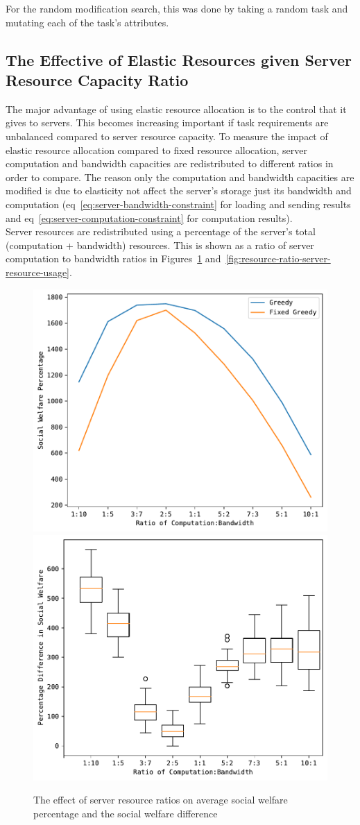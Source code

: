 For the random modification search, this was done by taking a random task and mutating each of the task's attributes.

\subsection{The Effective of Elastic Resources given Server Resource Capacity Ratio}
\label{subsec:the-effective-of-elastic-resources-given-server-resource-capacity-ratio}
The major advantage of using elastic resource allocation is to the control that it gives to servers. This becomes
increasing important if task requirements are unbalanced compared to server resource capacity. To measure the impact
of elastic resource allocation compared to fixed resource allocation, server computation and bandwidth capacities
are redistributed to different ratios in order to compare. The reason only the computation and bandwidth capacities
are modified is due to elasticity not affect the server's storage just its bandwidth and computation
(eq~\ref{eq:server-bandwidth-constraint} for loading and sending results and eq~\ref{eq:server-computation-constraint}
for computation results). \\
Server resources are redistributed using a percentage of the server's total (computation + bandwidth) resources.
This is shown as a ratio of server computation to bandwidth ratios in Figures~\ref{fig:resource-ratio-social-welfare}
and~\ref{fig:resource-ratio-server-resource-usage}.

\begin{figure}[h]
    \centering
    \includegraphics[width=0.45\linewidth]{figs/resource_ratio/social_welfare.pdf}
    \includegraphics[width=0.45\linewidth]{figs/resource_ratio/social_welfare_difference.pdf}
    \caption{The effect of server resource ratios on average social welfare percentage and the social welfare difference}
    \label{fig:resource-ratio-social-welfare}
\end{figure}

